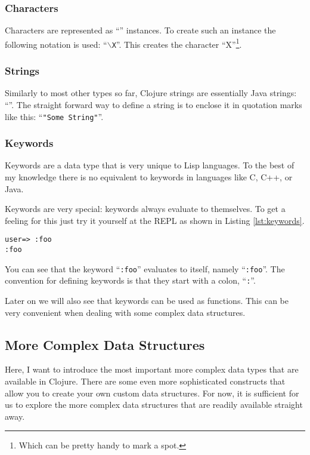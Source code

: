 \subsubsection{Characters}
Characters are represented as ``'' instances.
To create such an instance the following notation is used: ``\texttt{$\backslash$X}''.
This creates the character ``X''\footnote{Which can be pretty handy to mark a spot.}.

\subsubsection{Strings}
Similarly to most other types so far, Clojure strings are essentially Java strings: ``''.
The straight forward way to define a string is to enclose it in quotation marks like this: ``\texttt{"Some String"}''.

\subsubsection{Keywords}
Keywords are a data type that is very unique to Lisp languages.
To the best of my knowledge there is no equivalent to keywords in languages like C, C++, or Java.

Keywords are very special:
keywords always evaluate to themselves.
To get a feeling for this just try it yourself at the REPL as shown in Listing \vref{lst:keywords}.

\begin{lstlisting}[label=lst:keywords, caption=Keywords]
user=> :foo
:foo
\end{lstlisting}

You can see that the keyword ``\texttt{:foo}'' evaluates to itself, namely ``\texttt{:foo}''.
The convention for defining keywords is that they start with a colon, ``\texttt{:}''.

Later on we will also see that keywords can be used as functions.
This can be very convenient when dealing with some complex data structures.

\subsection{More Complex Data Structures}
Here, I want to introduce the most important more complex data types that are available in Clojure.
There are some even more sophisticated constructs that allow you to create your own custom data structures.
For now, it is sufficient for us to explore the more complex data structures that are readily available straight away.

